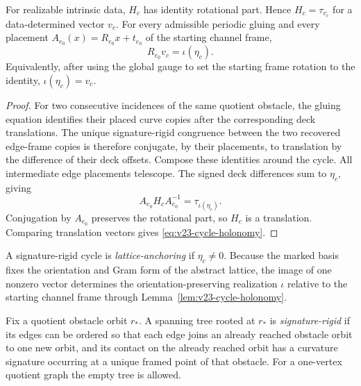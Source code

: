 \begin{lemma}
\label{lem:v23-cycle-holonomy}
For realizable intrinsic data, \(H_c\) has identity rotational part.  Hence
\(H_c=\tau_{v_c}\) for a data-determined vector \(v_c\).  For every admissible
periodic gluing and every placement \(A_{e_0}(x)=R_{e_0}x+t_{e_0}\) of the
starting channel frame,
\begin{equation}\label{eq:v23-cycle-holonomy}
                         R_{e_0}v_c=\iota(\eta_c).
\end{equation}
Equivalently, after using the global gauge to set the starting frame rotation
to the identity, \(\iota(\eta_c)=v_c\).
\end{lemma}

\begin{proof}
For two consecutive incidences of the same quotient obstacle, the gluing
equation identifies their placed curve copies after the corresponding deck
translations.  The unique signature-rigid congruence between the two recovered
edge-frame copies is therefore conjugate, by their placements, to translation
by the difference of their deck offsets.  Compose these identities around the
cycle.  All intermediate edge placements telescope.  The signed deck
differences sum to \(\eta_c\), giving
\[
 A_{e_0}H_cA_{e_0}^{-1}
 =\tau_{\iota(\eta_c)}.
\]
Conjugation by \(A_{e_0}\) preserves the rotational part, so \(H_c\) is a
translation.  Comparing translation vectors gives
\eqref{eq:v23-cycle-holonomy}.
\end{proof}

\begin{definition}
\label{def:v23-lattice-anchoring-cycle}
A signature-rigid cycle is \emph{lattice-anchoring} if \(\eta_c\ne0\).
Because the marked basis fixes the orientation and Gram form of the abstract
lattice, the image of one nonzero vector determines the
orientation-preserving realization \(\iota\) relative to the starting channel
frame through Lemma~\ref{lem:v23-cycle-holonomy}.
\end{definition}

\begin{definition}
\label{def:v23-signature-rigid-tree}
Fix a quotient obstacle orbit \(r_*\).  A spanning tree rooted at \(r_*\) is
\emph{signature-rigid} if its edges can be ordered so that each edge joins an
already reached obstacle orbit to one new orbit, and its contact on the already
reached orbit has a curvature signature occurring at a unique framed point of
that obstacle.  For a one-vertex quotient graph the empty tree is allowed.
\end{definition}

